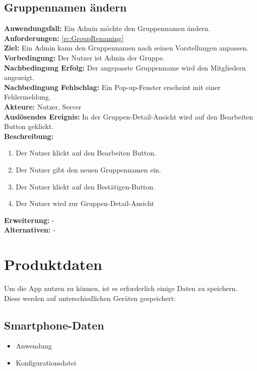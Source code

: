 \documentclass[parskip=full]{scrartcl}
\newcommand{\changelocaltocdepth}[1]{%
  \addtocontents{toc}{\protect\setcounter{tocdepth}{#1}}%
  \setcounter{tocdepth}{#1}%
}
\newcommand{\resetSubSectionNumbering}{
    \renewcommand{\thesubsection}{\arabic{section}.\arabic{subsection}}
    \changelocaltocdepth{3} 
}
\begin{document}
\subsection{Gruppennamen ändern}
\textbf{Anwendungsfall:} Ein Admin möchte den Gruppennamen ändern.\\
\textbf{Anforderungen:} \ref{rc:GroupRenaming}\\
\textbf{Ziel:} Ein Admin kann den Gruppennamen nach seinen Vorstellungen anpassen.\\
\textbf{Vorbedingung:} Der Nutzer ist Admin der Gruppe.\\
\textbf{Nachbedingung Erfolg:} Der angepasste Gruppenname wird den Mitgliedern angezeigt.\\
\textbf{Nachbedingung Fehlschlag:} Ein Pop-up-Fenster erscheint mit einer Fehlermeldung.\\
\textbf{Akteure:} Nutzer, Server \\
\textbf{Auslösendes Ereignis:} In der Gruppen-Detail-Ansicht wird auf den Bearbeiten Button geklickt.\\
\textbf{Beschreibung:}
\begin{enumerate}
    \item Der Nutzer klickt auf den Bearbeiten Button.
    \item Der Nutzer gibt den neuen Gruppennamen ein.
    \item Der Nutzer klickt auf den Bestätigen-Button.
    \item Der Nutzer wird zur Gruppen-Detail-Ansicht
\end{enumerate}
\textbf{Erweiterung:} -\\
\textbf{Alternativen:} -
\newpage

\resetSubSectionNumbering

\section{Produktdaten}
\changelocaltocdepth{1}
\renewcommand{\thesubsection}{$\langle$D\arabic{subsection}0$\rangle$}

Um die App nutzen zu können, ist es erforderlich einige Daten zu speichern. Diese werden auf unterschiedlichen Geräten gespeichert:

\subsection{Smartphone-Daten}
\begin{itemize}
    \item Anwendung
    \item Konfigurationsdatei
\end{itemize}
\end{document}
